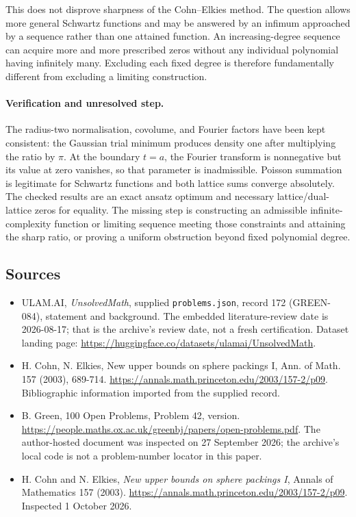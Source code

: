 \documentclass[11pt,a4paper]{article}
\begin{document}
This does not disprove sharpness of the Cohn--Elkies method. The question allows more general Schwartz functions and may be answered by an infimum approached by a sequence rather than one attained function. An increasing-degree sequence can acquire more and more prescribed zeros without any individual polynomial having infinitely many. Excluding each fixed degree is therefore fundamentally different from excluding a limiting construction.

\paragraph{Verification and unresolved step.}
The radius-two normalisation, covolume, and Fourier factors have been kept consistent: the Gaussian trial minimum produces density one after multiplying the ratio by $\pi$. At the boundary $t=a$, the Fourier transform is nonnegative but its value at zero vanishes, so that parameter is inadmissible. Poisson summation is legitimate for Schwartz functions and both lattice sums converge absolutely. The checked results are an exact ansatz optimum and necessary lattice/dual-lattice zeros for equality. The missing step is constructing an admissible infinite-complexity function or limiting sequence meeting those constraints and attaining the sharp ratio, or proving a uniform obstruction beyond fixed polynomial degree.

\subsection{Sources}

{\small

\begin{itemize}

\item[\hypertarget{source:172:1}{S1}] ULAM.AI, \emph{UnsolvedMath}, supplied \texttt{problems.json}, record 172 (GREEN-084), statement and background. The embedded literature-review date is 2026-08-17; that is the archive’s review date, not a fresh certification. Dataset landing page: \url{https://huggingface.co/datasets/ulamai/UnsolvedMath}.

\item[\hypertarget{source:172:2}{S2}] H. Cohn, N. Elkies, New upper bounds on sphere packings I, Ann. of Math. 157 (2003), 689-714. \url{https://annals.math.princeton.edu/2003/157-2/p09}. Bibliographic information imported from the supplied record.

\item[\hypertarget{source:172:3}{S3}] B. Green, 100 Open Problems, Problem 42, version. \url{https://people.maths.ox.ac.uk/greenbj/papers/open-problems.pdf}. The author-hosted document was inspected on 27 September 2026; the archive’s local code is not a problem-number locator in this paper.

\item[E1] H. Cohn and N. Elkies, \emph{New upper bounds on sphere packings I}, Annals of Mathematics 157 (2003). \url{https://annals.math.princeton.edu/2003/157-2/p09}. Inspected 1 October 2026.

\end{itemize}

}

\label{end:172}
\end{document}
